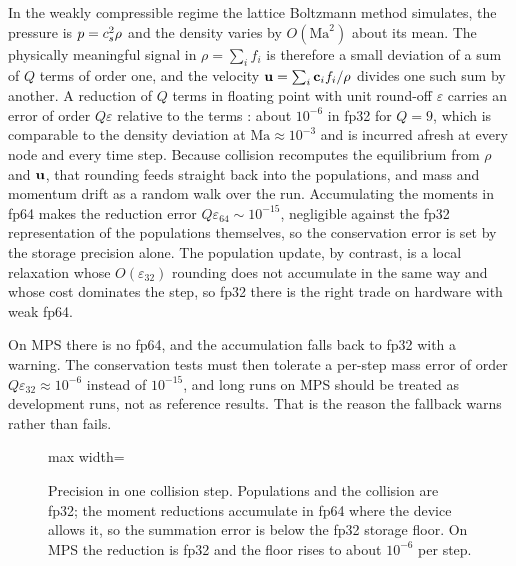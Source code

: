 In the weakly compressible regime the lattice Boltzmann method simulates, the pressure is
$p = c_s^2\rho$ and the density varies by $O(\mathrm{Ma}^2)$ about its mean. The physically
meaningful signal in $\rho = \sum_i f_i$ is therefore a small deviation of a sum of $Q$
terms of order one, and the velocity $\mathbf{u} = \sum_i \mathbf{c}_i f_i / \rho$ divides one such sum by
another. A reduction of $Q$ terms in floating point with unit round-off $\varepsilon$ carries
an error of order $Q\varepsilon$ relative to the terms \parencite{Higham2002}: about
$10^{-6}$ in fp32 for $Q = 9$, which is comparable to the density deviation at
$\mathrm{Ma} \approx 10^{-3}$ and is incurred afresh at every node and every time step.
Because collision recomputes the equilibrium from $\rho$ and $\mathbf{u}$, that rounding feeds
straight back into the populations, and mass and momentum drift as a random walk over the
run. Accumulating the moments in fp64 makes the reduction error $Q\varepsilon_{64} \sim
10^{-15}$, negligible against the fp32 representation of the populations themselves, so the
conservation error is set by the storage precision alone. The population update, by
contrast, is a local relaxation whose $O(\varepsilon_{32})$ rounding does not accumulate in
the same way and whose cost dominates the step, so fp32 there is the right trade on hardware
with weak fp64.

On MPS there is no fp64, and the accumulation falls back to fp32 with a warning. The
conservation tests must then tolerate a per-step mass error of order $Q\varepsilon_{32}
\approx 10^{-6}$ instead of $10^{-15}$, and long runs on MPS should be treated as
development runs, not as reference results. That is the reason the fallback warns rather
than fails.

\begin{figure}[h]
\centering
\begin{adjustbox}{max width=\linewidth}\end{adjustbox}
\caption{Precision in one collision step. Populations and the collision are fp32; the
moment reductions accumulate in fp64 where the device allows it, so the summation error is
below the fp32 storage floor. On MPS the reduction is fp32 and the floor rises to about
$10^{-6}$ per step.}
\label{fig:precision}
\end{figure}
